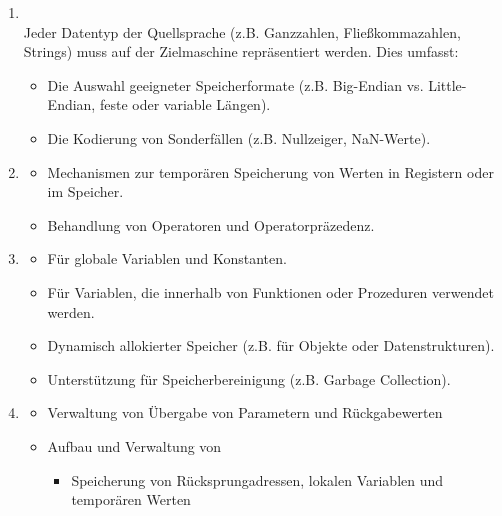 \begin{enumerate}
    \item {}\\
    Jeder Datentyp der Quellsprache (z.B. Ganzzahlen, Fließkommazahlen, Strings) muss auf der Zielmaschine repräsentiert werden. Dies umfasst:
    \begin{itemize}
        \item Die Auswahl geeigneter Speicherformate (z.B. Big-Endian vs. Little-Endian, feste oder variable Längen).
        \item Die Kodierung von Sonderfällen (z.B. Nullzeiger, NaN-Werte).
    \end{itemize}
    \item {}
    \begin{itemize}
        \item Mechanismen zur temporären Speicherung von Werten in Registern oder im Speicher.
        \item Behandlung von Operatoren und Operatorpräzedenz.
    \end{itemize}
    \item {}
    \begin{itemize}
        \item {} Für globale Variablen und Konstanten.
        \item {} Für Variablen, die innerhalb von Funktionen oder Prozeduren verwendet werden.
        \item {} Dynamisch allokierter Speicher (z.B. für Objekte oder Datenstrukturen).
        \item Unterstützung für Speicherbereinigung (z.B. Garbage Collection).
    \end{itemize}
    \item {}
    \begin{itemize}
        \item Verwaltung von  Übergabe von Parametern und Rückgabewerten
        \item Aufbau und Verwaltung von 
        \begin{itemize}
            \item Speicherung von Rücksprungadressen, lokalen Variablen und temporären Werten
        \end{itemize}

\end{itemize}
\end{enumerate}
